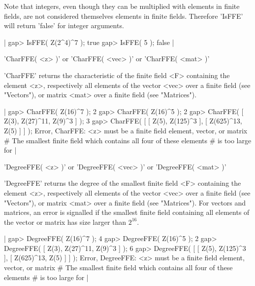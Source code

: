 Note that integers,  even though they can  be multiplied with elements in
finite fields, are not  considered themselves elements in  finite fields.
Therefore 'IsFFE' will return 'false' for integer arguments.

|    gap> IsFFE( Z(2^4)^7 );
    true
    gap> IsFFE( 5 );
    false |

%

'CharFFE( <z> )' or 'CharFFE( <vec> )' or 'CharFFE( <mat> )'

'CharFFE' returns the characteristic  of the finite  field <F> containing
the  element <z>, respectively  all  elements of the  vector <vec> over a
finite field (see "Vectors"), or matrix  <mat> over  a  finite field (see
"Matrices").

|    gap> CharFFE( Z(16)^7 );
    2
    gap> CharFFE( Z(16)^5 );
    2
    gap> CharFFE( [ Z(3), Z(27)^11, Z(9)^3 ] );
    3
    gap> CharFFE( [ [ Z(5), Z(125)^3 ], [ Z(625)^13, Z(5) ] ] );
    Error, CharFFE: <z> must be a finite field element, vector, or matrix
    # The smallest finite field which contains all four of these elements
    # is too large for {\GAP} |

%

'DegreeFFE( <z> )' or 'DegreeFFE( <vec> )' or 'DegreeFFE( <mat> )'

'DegreeFFE'  returns  the   degree of  the   smallest  finite field   <F>
containing the element <z>, respectively all elements of the vector <vec>
over a finite field (see "Vectors"), or matrix  <mat> over a finite field
(see "Matrices").  For vectors and matrices, an error is signalled if the
smallest finite field containing all elements of the vector or matrix has
size larger than $2^{16}$.

|    gap> DegreeFFE( Z(16)^7 );
    4
    gap> DegreeFFE( Z(16)^5 );
    2
    gap> DegreeFFE( [ Z(3), Z(27)^11, Z(9)^3 ] );
    6
    gap> DegreeFFE( [ [ Z(5), Z(125)^3 ], [ Z(625)^13, Z(5) ] ] );
    Error, DegreeFFE: <z> must be a finite field element, vector, or matrix
    # The smallest finite field which contains all four of these elements
    # is too large for {\GAP} |

%

